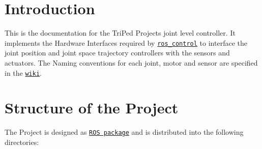 \hypertarget{index_intro}{}\section{Introduction}\label{index_intro}
This is the documentation for the Tri\+Ped Projects joint level controller. It implements the Hardware Interfaces required by \href{http://wiki.ros.org/ros_control}{\tt ros\+\_\+control} to interface the joint position and joint space trajectory controllers with the sensors and actuators. The Naming conventions for each joint, motor and sensor are specified in the \href{https://github.com/TriPed-Robot/Wiki/wiki/One-Legged-Sub-Robot}{\tt wiki}. \hypertarget{index_content}{}\section{Structure of the Project}\label{index_content}
The Project is designed as \href{http://wiki.ros.org/Packages}{\tt R\+OS package} and is distributed into the following directories\+:


